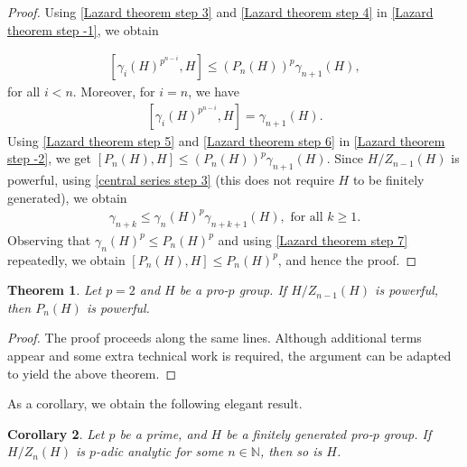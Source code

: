 \documentclass[12pt]{elsarticle}
\newtheorem{theorem}{Theorem}[section]
\newtheorem{corollary}[theorem]{Corollary}
\newtheorem*{main corollary*}{Main Corollary}
\theoremstyle{definition}
\begin{document}
\begin{proof}
Using \eqref{Lazard theorem step 3} and \eqref{Lazard theorem step 4} in \eqref{Lazard theorem step -1}, we obtain

\begin{align}\label{Lazard theorem step 5}
    [\gamma_i(H)^{p^{n-i}},H] \leqslant (P_n(H))^p\gamma_{n+1}(H),
\end{align} for all $i<n.$ Moreover, for $i=n$, we have \begin{align}\label{Lazard theorem step 6}
    [\gamma_i(H)^{p^{n-i}},H]=\gamma_{n+1}(H).
\end{align}
Using \eqref{Lazard theorem step 5} and \eqref{Lazard theorem step 6} in \eqref{Lazard theorem step -2}, we get ${[P_n(H),H] \leqslant (P_n(H))^p \gamma_{n+1}(H)}$. Since $H/Z_{n-1}(H)$ is powerful, using \eqref{central series step 3} (this does not require $H$ to be finitely generated), we obtain \begin{align}\label{Lazard theorem step 7}
    \gamma_{n+k} \leqslant \gamma_n(H)^p\gamma_{n+k+1}(H), \text{ for all $k\geq1$}.
\end{align}
Observing that $\gamma_n(H)^p\leqslant P_n(H)^p$ and using \eqref{Lazard theorem step 7} repeatedly, we obtain $[P_n(H),H]  \leqslant  P_n(H)^p$, and hence the proof.
\end{proof}

\begin{theorem} \label{P_npowerfulevenprime}
    Let $p=2$ and $H$ be a pro-$p$ group. If $H/Z_{n-1}(H)$ is powerful, then $P_n(H)$ is powerful.
\end{theorem}
\begin{proof}
    The proof proceeds along the same lines. Although additional terms appear and some extra technical work is required, the argument can be adapted to yield the above theorem.
\end{proof}

As a corollary, we obtain the following elegant result.


\begin{corollary} \label{padic analytic from padic analytic}
    Let $p$ be a prime, and $H$ be a finitely generated pro-$p$ group. If $H/Z_n(H)$ is $p$-adic analytic for some $n\in \mathbb{N}$, then so is $H$.
\end{corollary}
\end{document}

